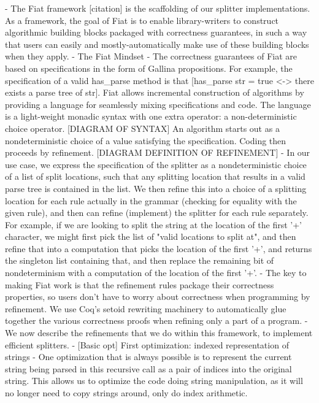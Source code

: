     - The Fiat framework [citation] is the scaffolding of our splitter implementations.  As a framework, the goal of Fiat is to enable library-writers to construct algorithmic building blocks packaged with correctness guarantees, in such a way that users can easily and mostly-automatically make use of these building blocks when they apply.
    - The Fiat Mindset
      - The correctness guarantees of Fiat are based on specifications in the form of Gallina propositions.  For example, the specification of a valid has_parse method is that [has_parse str = true <-> there exists a parse tree of str].  Fiat allows incremental construction of algorithms by providing a language for seamlessly mixing specifications and code.  The language is a light-weight monadic syntax with one extra operator: a non-deterministic choice operator.  [DIAGRAM OF SYNTAX]  An algorithm starts out as a nondeterministic choice of a value satisfying the specification.  Coding then proceeds by refinement.  [DIAGRAM DEFINITION OF REFINEMENT]
      - In our use case, we express the specification of the splitter as a nondeterministic choice of a list of split locations, such that any splitting location that results in a valid parse tree is contained in the list.  We then refine this into a choice of a splitting location for each rule actually in the grammar (checking for equality with the given rule), and then can refine (implement) the splitter for each rule separately.   For example, if we are looking to split the string at the location of the first '+' character, we might first pick the list of "valid locations to split at", and then refine that into a computation that picks the location of the first '+', and returns the singleton list containing that, and then replace the remaining bit of nondeterminism with a computation of the location of the first '+'.
      - The key to making Fiat work is that the refinement rules package their correctness properties, so users don't have to worry about correctness when programming by refinement.  We use Coq's setoid rewriting machinery to automatically glue together the various correctness proofs when refining only a part of a program.
    - We now describe the refinements that we do within this framework, to implement efficient splitters.
  - [Basic opt] First optimization: indexed representation of strings
    - One optimization that is always possible is to represent the current string being parsed in this recursive call as a pair of indices into the original string.  This allows us to optimize the code doing string manipulation, as it will no longer need to copy strings around, only do index arithmetic.

